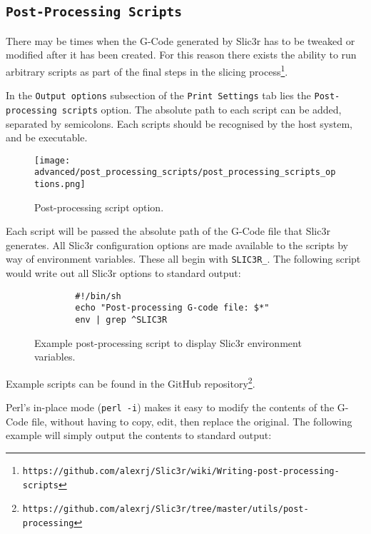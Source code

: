 
\subsection{\texttt{Post-Processing Scripts}} %
\label{sec:post_processing_scripts}

There may be times when the G-Code generated by Slic3r has to be tweaked or modified after it has been created.  For this reason there exists the ability to run arbitrary scripts as part of the final steps in the slicing process\footnote{\texttt{https://github.com/alexrj/Slic3r/wiki/Writing-post-processing-scripts}}.

In the \texttt{Output options} subsection of the \texttt{Print Settings} tab lies the \texttt{Post-processing scripts} option.  The absolute path to each script can be added, separated by semicolons. Each scripts should be recognised by the host system, and be executable.

\begin{figure}[H]
\centering
\texttt{[image: advanced/post\_processing\_scripts/post\_processing\_scripts\_options.png]}
\caption{Post-processing script option.}
\label{fig:post_processing_scripts_options}
\end{figure}

Each script will be passed the absolute path of the G-Code file that Slic3r generates.  All Slic3r configuration options are made available to the scripts by way of environment variables.  These all begin with \texttt{SLIC3R\_}.  The following script would write out all Slic3r options to standard output:

\begin{figure}[H]
\small
\begin{verbatim}
        #!/bin/sh
        echo "Post-processing G-code file: $*"
        env | grep ^SLIC3R
\end{verbatim}
\caption{Example post-processing script to display Slic3r environment variables.}
\label{fig:exaple_post_processing_script_env_vars}
\end{figure}

Example scripts can be found in the GitHub repository\footnote{\texttt{https://github.com/alexrj/Slic3r/tree/master/utils/post-processing}}.


Perl's in-place mode (\texttt{perl -i}) makes it easy to modify the contents of the G-Code file, without having to copy, edit, then replace the original.  The following example will simply output the contents to standard output:


